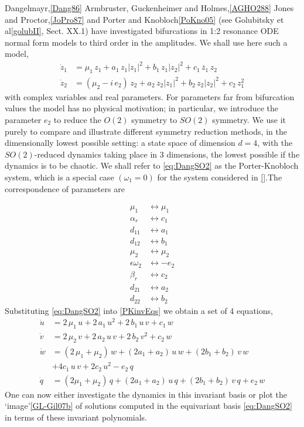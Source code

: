 \documentclass{article}
\begin{document}
Dangelmayr,\ref{Dang86} Armbruster, Guckenheimer and Holmes,\ref{AGHO288}
Jones and Proctor,\ref{JoPro87} and Porter and Knobloch\ref{PoKno05} (see
Golubitsky et al\ref{golubII}, Sect. XX.1) have investigated bifurcations
in 1:2 resonance ODE normal form models to third order in the amplitudes.
We shall use here such a model,
\begin{subequations}\label{eq:DangSO2}
\begin{align}
  \dot{z}_1 &= \mu_1\,z_1+a_1\,z_1|z_1|^2+b_1\,z_1|z_2|^2+c_1\,\overline{z}_1\,z_2\,\\
  \dot{z}_2 &= (\mu_2-i\, e_2)\,{z_2}+a_2\,z_2|z_1|^2+b_2\,z_2|z_2|^2+c_2\,z_1^2
\end{align}
\end{subequations}
with complex variables and real parameters. For parameters
far from bifurcation values the model has no physical motivation; in
particular, we introduce the parameter $e_2$ to reduce the $O(2)$ symmetry to $SO(2)$ symmetry. We use it purely to compare and
illustrate different symmetry reduction methods, in the dimensionally
lowest possible setting: a state space of dimension $d=4$, with the
$SO(2)$-reduced dynamics taking place in 3 dimensions, the lowest
possible if the dynamics is to be chaotic. We shall refer to
\ref{eq:DangSO2} as the Porter-Knobloch system, which is a special case $(\omega_1=0)$ for the system considered in \ref{}.The correspondence of parameters are

\begin{align}
\mu_1&\leftrightarrow\mu_1\\
\alpha_r&\leftrightarrow c_1\\
d_{11}&\leftrightarrow a_1\\
d_{12}&\leftrightarrow b_1\\
\mu_2&\leftrightarrow\mu_2\\
\epsilon\omega_2&\leftrightarrow-e_2\\
\beta_r&\leftrightarrow c_2\\
d_{21}&\leftrightarrow a_2 \\
d_{22}&\leftrightarrow b_2
\end{align}
Substituting
\ref{eq:DangSO2} into \ref{PKinvEqs} we obtain a set of 4 equations,
\begin{equation}
\begin{split}
  \dot{u} &= 2\,\mu_1\,u+2\,a_1\,u^2+2\,b_1\,u\,v+c_1\,w\\
  \dot{v} &= 2\,\mu_2\,v+2\,a_2\,u\,v+2\,b_2\,v^2+c_2\,w\\
  \dot{w} &= (2\,\mu_1+\mu_2)\,w+(2a_1+a_2)\,u\,w+(2b_1+b_2)\,v\,w\\
	&+4c_1\,u\,v + 2c_2\,u^2 - e_2\,q
\label{PKinvEqs1}\\
  \dot{q} &= (2\mu_1+\mu_2)\,q+(2a_1+a_2)\,u\,q+(2b_1+b_2)\,v\,q
             +e_2\,w
\end{split}
\end{equation}
One can now either investigate the dynamics in this invariant basis or
plot the `image'\ref{GL-Gil07b} of solutions computed in the equivariant
basis \ref{eq:DangSO2} in terms of these invariant polynomials.
\end{document}
